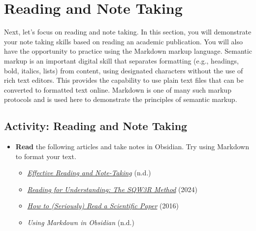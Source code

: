 \documentclass[
  letterpaper,
  DIV=11,
  numbers=noendperiod]{scrreprt}
\providecommand{\tightlist}{%
  \setlength{\itemsep}{0pt}\setlength{\parskip}{0pt}}\usepackage{longtable,booktabs,array}
\begin{document}
\section{Reading and Note Taking}\label{reading-and-note-taking}

Next, let's focus on reading and note taking. In this section, you will
demonstrate your note taking skills based on reading an academic
publication. You will also have the opportunity to practice using the
Markdown markup language. Semantic markup is an important digital skill
that separates formatting (e.g., headings, bold, italics, lists) from
content, using designated characters without the use of rich text
editors. This provides the capability to use plain text files that can
be converted to formatted text online. Markdown is one of many such
markup protocols and is used here to demonstrate the principles of
semantic markup.

\subsection{Activity: Reading and Note
Taking}\label{activity-reading-and-note-taking}

\begin{tcolorbox}[enhanced jigsaw, toprule=.15mm, colback=white, colframe=quarto-callout-note-color-frame, bottomtitle=1mm, leftrule=.75mm, coltitle=black, titlerule=0mm, rightrule=.15mm, colbacktitle=quarto-callout-note-color!10!white, left=2mm, title={Learning Activity}, opacitybacktitle=0.6, opacityback=0, breakable, toptitle=1mm, arc=.35mm, bottomrule=.15mm]

\begin{itemize}
\tightlist
\item
  \textbf{Read} the following articles and take notes in Obsidian. Try
  using Markdown to format your text.

  \begin{itemize}
  \tightlist
  \item
    \href{https://www.student.unsw.edu.au/effective-reading-and-note-taking}{\emph{Effective
    Reading and Note-Taking}} (n.d.)
  \item
    \href{https://www.student.unsw.edu.au/reading-understanding}{\emph{Reading
    for Understanding: The SQW3R Method}} (2024)
  \item
    \href{https://www.science.org/content/article/how-seriously-read-scientific-paper}{\emph{How
    to (Seriously) Read a Scientific Paper}} (2016)
  \item
    \emph{Using Markdown in Obsidian} (n.d.)
  \end{itemize}
\end{itemize}

\end{tcolorbox}
\end{document}
